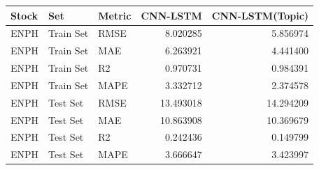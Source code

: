 \begin{tabular}{lllrr}
\toprule
Stock & Set & Metric & CNN-LSTM & CNN-LSTM(Topic) \\
\midrule
ENPH & Train Set & RMSE & 8.020285 & 5.856974 \\
ENPH & Train Set & MAE & 6.263921 & 4.441400 \\
ENPH & Train Set & R2 & 0.970731 & 0.984391 \\
ENPH & Train Set & MAPE & 3.332712 & 2.374578 \\
ENPH & Test Set & RMSE & 13.493018 & 14.294209 \\
ENPH & Test Set & MAE & 10.863908 & 10.369679 \\
ENPH & Test Set & R2 & 0.242436 & 0.149799 \\
ENPH & Test Set & MAPE & 3.666647 & 3.423997 \\
\bottomrule
\end{tabular}
